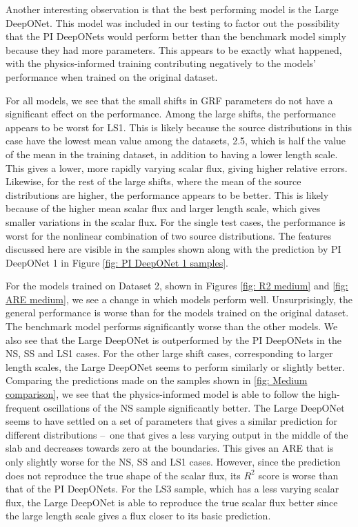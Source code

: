 \documentclass[%
 reprint,
 amsmath,amssymb,
 aps,
]{revtex4-1}
\begin{document}
Another interesting observation is that the best performing model is the Large DeepONet. This model was included in our testing to factor out the possibility
that the PI DeepONets would perform better than the benchmark model simply because they had more parameters. This appears to be exactly what happened,
with the physics-informed training contributing negatively to the models' performance when trained on the original dataset.

For all models, we see that the small shifts in GRF parameters do not have a significant effect on the performance. Among the large shifts, the performance
appears to be worst for LS1. This is likely because the source distributions in this case have the lowest mean value among the datasets, 2.5, which is
half the value of the mean in the training dataset, in addition to having a lower length scale. This gives a lower, more rapidly varying scalar flux,
giving higher relative errors. Likewise, for the rest of the large
shifts, where the mean of the source distributions are higher, the performance appears to be better. This is likely because of the higher mean scalar flux
and larger length scale, which gives smaller variations in the scalar flux. For the single test cases, the performance is worst for the nonlinear
combination of two source distributions. The features discussed here are visible in the samples shown along with the prediction by PI DeepONet 1 in Figure
\ref{fig: PI DeepONet 1 samples}.

For the models trained on Dataset 2, shown in Figures \ref{fig: R2 medium} and \ref{fig: ARE medium}, we see a change in which models
perform well. Unsurprisingly, the general performance is worse than for the models trained on the original dataset. The benchmark model performs significantly
worse than the other models. We also see that the Large DeepONet is outperformed by the PI DeepONets in the NS, SS and LS1 cases. For the other large shift
cases, corresponding to larger length scales, the Large DeepONet seems to perform similarly or slightly better. Comparing the predictions made on the samples shown
in \ref{fig: Medium comparison}, we see that the physics-informed model is able to follow the high-frequent oscillations of the NS sample significantly
better. The Large DeepONet seems to have settled on a set of parameters that gives a similar prediction for different distributions – one that gives a less
varying output in the middle of the slab and decreases towards zero at the boundaries. This gives an ARE that is only slightly worse for the NS, SS and LS1
cases. However, since the prediction does not reproduce the true shape of the scalar flux, its $R^2$ score is worse than that of the PI DeepONets.
For the LS3 sample, which has a less varying scalar flux, the Large DeepONet is able to reproduce the true scalar flux better since the large length scale
gives a flux closer to its basic prediction.
\end{document}
